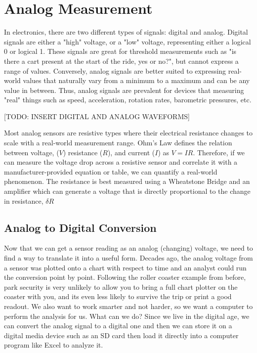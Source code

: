 \chapter{Analog Measurement} \label{chap:analog_measurement}
In electronics, there are two different types of signals: digital and analog.
Digital signals are either a "high" voltage, or a "low" voltage, representing either a logical 0 or logical 1.
These signals are great for threshold measurements such as "is there a cart present at the start of the ride, yes or no?", but cannot express a range of values.
Conversely, analog signals are better suited to expressing real-world values that naturally vary from a minimum to a maximum and can be any value in between.
Thus, analog signals are prevalent for devices that measuring "real" things such as speed, acceleration, rotation rates, barometric pressures, etc.

[TODO: INSERT DIGITAL AND ANALOG WAVEFORMS]

Most analog sensors are resistive types where their electrical resistance changes to scale with a real-world measurement range.
Ohm's Law defines the relation between voltage, ($V$) resistance ($R$), and current ($I$) as $V=IR$.
Therefore, if we can measure the voltage drop across a resistive sensor and correlate it with a manufacturer-provided equation or table, we can quantify a real-world phenomenon.
The resistance is best measured using a Wheatstone Bridge and an amplifier which can generate a voltage that is directly proportional to the change in resistance, $\delta R$

\section{Analog to Digital Conversion} \label{sec:analog_to_digital_conversion}
Now that we can get a sensor reading as an analog (changing) voltage, we need to find a way to translate it into a useful form.
Decades ago, the analog voltage from a sensor was plotted onto a chart with respect to time and an analyst could run the conversion point by point.
Following the roller coaster example from before, park security is very unlikely to allow you to bring a full chart plotter on the coaster with you, and its even less likely to survive the trip or print a good readout.
We also want to work smarter and not harder, so we want a computer to perform the analysis for us. 
What can we do?
Since we live in the digital age, we can convert the analog signal to a digital one and then we can store it on a digital media device such as an SD card then load it directly into a computer program like Excel to analyze it.

